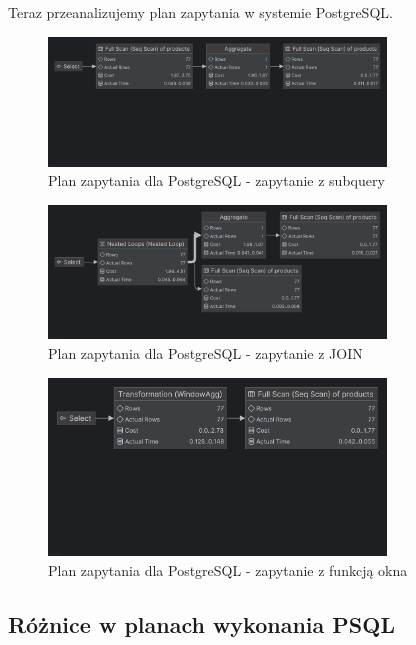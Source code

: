 \documentclass{article}
\begin{document}
Teraz przeanalizujemy plan zapytania w systemie PostgreSQL.

\begin{figure}[H]
    \centering
    \includegraphics[width=0.8\textwidth]{../images/psql_subquery_explain.png}
    \caption{Plan zapytania dla PostgreSQL - zapytanie z subquery}
    \label{fig:postgres1}
\end{figure}

\begin{figure}[H]
    \centering
    \includegraphics[width=0.8\textwidth]{../images/psql_join_explain.png}
    \caption{Plan zapytania dla PostgreSQL - zapytanie z JOIN}
    \label{fig:postgres2}
\end{figure}

\begin{figure}[H]
    \centering
    \includegraphics[width=0.8\textwidth]{../images/psql_window_explain.png}
    \caption{Plan zapytania dla PostgreSQL - zapytanie z funkcją okna}
    \label{fig:postgres3}
\end{figure}

\subsection*{Różnice w planach wykonania PSQL}
\end{document}
